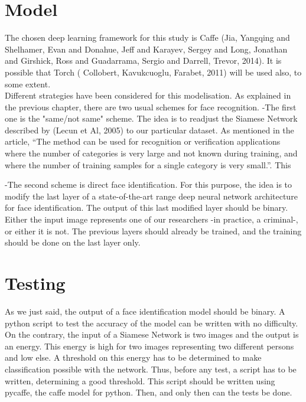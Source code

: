 \section{Model}

The chosen deep learning framework for this study is Caffe (Jia, Yangqing and Shelhamer, Evan and Donahue, Jeff and Karayev, Sergey and Long, Jonathan and Girshick, Ross and Guadarrama, Sergio and Darrell, Trevor, 2014). It is possible that Torch ( Collobert, Kavukcuoglu, Farabet, 2011) will be used also, to some extent.\\

Different strategies have been considered for this modelisation. As explained in the previous chapter, there are two usual schemes for face recognition.\newline
-The first one is the "same/not same" scheme. The idea is to readjust the Siamese Network described by (Lecun et Al, 2005) to our particular dataset. As mentioned in the article, \enquote{The method can be used for recognition or verification applications where the number of categories is very large and not known during training, and where the number of training samples for a single category is very small.}. This 

\newline
-The second scheme is direct face identification. For this purpose, the idea is to modify the last layer of a state-of-the-art range deep neural network architecture for face identification. The output of this last modified layer should be binary. Either the input image represents one of our researchers -in practice, a criminal-, or either it is not. The previous layers should already be trained, and the training should be done on the last layer only.

\section{Testing}

As we just said, the output of a face identification model should be binary. A python script to test the accuracy of the model can be written with no difficulty. On the contrary, the input of a Siamese Network is two images and the output is an energy. This energy is high for two images representing two different persons and low else. A threshold on this energy has to be determined to make classification possible with the network. Thus, before any test, a script has to be written, determining a good threshold. This script should be written using pycaffe, the caffe model for python. Then, and only then can the tests be done.

